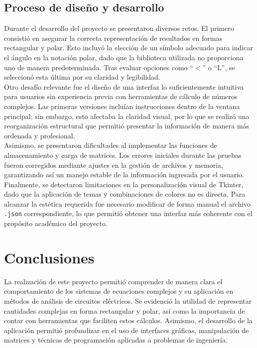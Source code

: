 \documentclass[12pt,a4paper]{article}
\begin{document}
\subsection{Proceso de diseño y desarrollo}

Durante el desarrollo del proyecto se presentaron diversos retos. El primero consistió en asegurar la correcta representación de resultados en formas rectangular y polar. Esto incluyó la elección de un símbolo adecuado para indicar el ángulo en la notación polar, dado que la biblioteca utilizada no proporciona uno de manera predeterminada. Tras evaluar opciones como “$<$” o “L”, se seleccionó esta última por su claridad y legibilidad. \\

Otro desafío relevante fue el diseño de una interfaz lo suficientemente intuitiva para usuarios sin experiencia previa con herramientas de cálculo de números complejos. Las primeras versiones incluían instrucciones dentro de la ventana principal; sin embargo, esto afectaba la claridad visual, por lo que se realizó una reorganización estructural que permitió presentar la información de manera más ordenada y profesional. \\

Asimismo, se presentaron dificultades al implementar las funciones de almacenamiento y carga de matrices. Los errores iniciales durante las pruebas fueron corregidos mediante ajustes en la gestión de archivos y memoria, garantizando así un manejo estable de la información ingresada por el usuario. \\

Finalmente, se detectaron limitaciones en la personalización visual de Tkinter, dado que la aplicación de temas y combinaciones de colores no es directa. Para alcanzar la estética requerida fue necesario modificar de forma manual el archivo \texttt{.json} correspondiente, lo que permitió obtener una interfaz más coherente con el propósito académico del proyecto.


\section{Conclusiones}

La realización de este proyecto permitió comprender de manera clara el comportamiento de los sistemas de ecuaciones complejos y su aplicación en métodos de análisis de circuitos eléctricos. Se evidenció la utilidad de representar cantidades complejas en forma rectangular y polar, así como la importancia de contar con herramientas que faciliten estos cálculos. Asimismo, el desarrollo de la aplicación permitió profundizar en el uso de interfaces gráficas, manipulación de matrices y técnicas de programación aplicadas a problemas de ingeniería.
\end{document}
